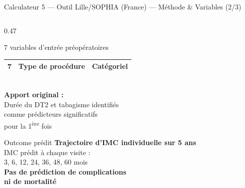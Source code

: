 \documentclass[aspectratio=169]{beamer}
\begin{document}
\begin{frame}{Calculateur 5 --- Outil Lille/SOPHIA (France) --- Méthode \& Variables (2/3)}
\begin{columns}[T]
\begin{column}{0.47\textwidth}
\begin{block}{7 variables d'entrée préopératoires}
\begin{tabular}{clc}
          7 & Type de procédure     & Catégoriel \\
          \bottomrule
        \end{tabular}
        \vspace{6pt}\\
        \textcolor{vertdoux}{\textbf{Apport original :}}\\
        Durée du DT2 et tabagisme identifiés\\
        comme prédicteurs significatifs\\
        pour la 1\textsuperscript{ère} fois
      \end{block}
      \vspace{0.3em}
      \begin{block}{Outcome prédit}
        \footnotesize
        \textbf{Trajectoire d'IMC individuelle sur 5 ans}\\
        IMC prédit à chaque visite :\\
        3, 6, 12, 24, 36, 48, 60 mois\\[4pt]
        \textcolor{rougealerte}{\textbf{Pas de prédiction de complications\\
        ni de mortalité}}
      \end{block}
    \end{column}
  \end{columns}
\end{frame}
\end{document}
